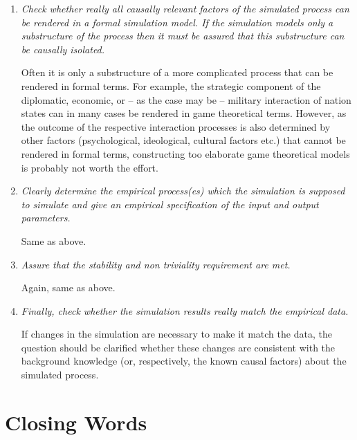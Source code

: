 \begin{enumerate}

\item {\em Check whether really all causally relevant factors of the
simulated process can be rendered in a formal simulation model. If the
simulation models only a substructure of the process then it must be assured
that this substructure can be causally isolated.}

Often it is only a substructure of a more complicated process that can be
rendered in formal terms. For example, the strategic component of the
diplomatic, economic, or -- as the case may be -- military interaction of
nation states can in many cases be rendered in game theoretical terms.
However, as the outcome of the respective interaction processes is also
determined by other factors (psychological, ideological, cultural factors
etc.) that cannot be rendered in formal terms, constructing too elaborate game
theoretical models is probably not worth the effort.

\item {\em Clearly determine the empirical process(es) which the simulation
is supposed to simulate and give an empirical specification of the input and
output parameters.}

Same as above.

\item {\em Assure that the stability and non triviality requirement are met.}

Again, same as above.

\item {\em Finally, check whether the simulation results really match the
empirical data.}

If changes in the simulation are necessary to make it match the data, the
question should be clarified whether these changes are consistent with the
background knowledge (or, respectively, the known causal factors) about the
simulated process.

\end{enumerate}

\section{Closing Words}

